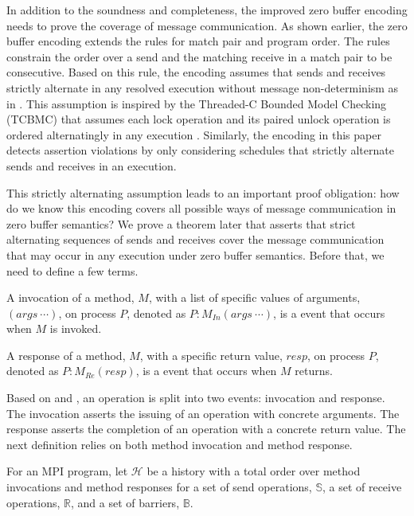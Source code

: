 In addition to the soundness and completeness, the improved zero buffer encoding needs to prove the coverage of message communication. As shown earlier, the zero buffer encoding extends the rules for match pair and program order. The rules constrain the order over a send and the matching receive in a match pair to be consecutive. Based on this rule, the encoding assumes that sends and receives strictly alternate in any resolved execution without message non-determinism as in . This assumption is inspired by the Threaded-C Bounded Model Checking (TCBMC) that assumes each lock operation and its paired unlock operation is ordered alternatingly in any execution \cite{DBLP:conf/cav/RabinovitzG05}. Similarly, the encoding in this paper detects assertion violations by only considering schedules that strictly alternate sends and receives in an execution. 

This strictly alternating assumption leads to an important proof obligation: how do we know this encoding covers all possible ways of message communication in zero buffer semantics? We prove a theorem later that asserts that strict alternating sequences of sends and receives cover the message communication that may occur in any execution under zero buffer semantics. Before that, we need to define a few terms.

\begin{definition}\label{def:invocation}
A invocation of a method, $M$, with a list of specific values of arguments, $(args\ \cdots)$, on process $P$, denoted as $P:M_\mathit{In}(args\ \cdots)$, is a event that occurs when $M$ is invoked. 
\end{definition}

\begin{definition}\label{def:response}
A response of a method, $M$, with a specific return value, $resp$, on process $P$, denoted as $P:M_\mathit{Re}(resp)$, is a event that occurs when $M$ returns. 
\end{definition}

Based on  and , an operation is split into two events: invocation and response. The invocation asserts the issuing of an operation with concrete arguments. The response asserts the completion of an operation with a concrete return value. The next definition relies on both method invocation and method response. 

\begin{definition}[History]\label{def:history}
For an MPI program, let $\mathcal{H}$ be a history with a total order over method invocations and method responses for a set of send operations, $\mathbb{S}$, a set of receive operations, $\mathbb{R}$, and a set of barriers, $\mathbb{B}$.
\end{definition}


